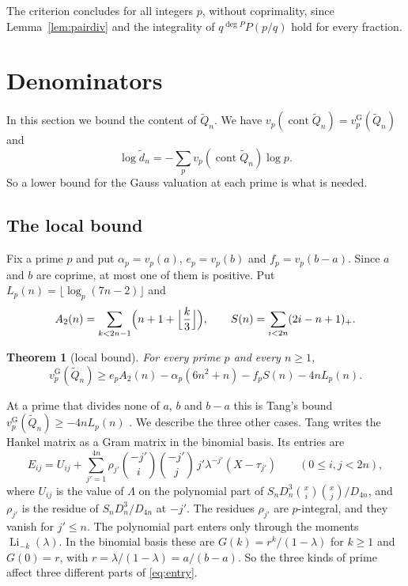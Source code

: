\documentclass[11pt]{amsart}
\newtheorem{theorem}{Theorem}[section]
\theoremstyle{definition}
\theoremstyle{remark}
\numberwithin{equation}{section}
\newcommand{\Li}{\operatorname{Li}}
\newcommand{\vG}{v_p^{\mathrm G}}
\newcommand{\cont}{\operatorname{cont}}
\begin{document}
The criterion concludes for all integers $p$, without coprimality, since Lemma~\ref{lem:pairdiv} and the integrality
of $q^{\deg P}P(p/q)$ hold for every fraction.

\section{Denominators}\label{sec:content}

In this section we bound the content of $\tilde Q_n$. We have $v_p(\cont\tilde Q_n)=\vG(\tilde Q_n)$ and
\[
 \log\tilde d_n=-\sum_pv_p(\cont\tilde Q_n)\log p .
\]
So a lower bound for the Gauss valuation at each prime is what is needed.

\subsection{The local bound}
Fix a prime $p$ and put $\alpha_p=v_p(a)$, $e_p=v_p(b)$ and $f_p=v_p(b-a)$. Since $a$ and $b$ are coprime, at most one
of them is positive. Put $L_p(n)=\lfloor\log_p(7n-2)\rfloor$ and
\[
 A_2(n)=\sum_{k<2n-1}\Bigl(n+1+\Bigl\lfloor\frac k3\Bigr\rfloor\Bigr),\qquad S(n)=\sum_{i<2n}(2i-n+1)_+ .
\]

\begin{theorem}[local bound]\label{thm:K}
For every prime $p$ and every $n\ge1$,
\[
 \vG(\tilde Q_n)\ge e_pA_2(n)-\alpha_p(6n^2+n)-f_pS(n)-4nL_p(n).
\]
\end{theorem}

At a prime that divides none of $a$, $b$ and $b-a$ this is Tang's bound
$\vG(\tilde Q_n)\ge-4nL_p(n)$ \cite{TangLi2}. We describe the three other cases. Tang writes the Hankel matrix as a Gram
matrix in the binomial basis. Its entries are
\begin{equation}\label{eq:entry}
 E_{ij}=U_{ij}+\sum_{j'=1}^{4n}\rho_{j'}\binom{-j'}i\binom{-j'}j\,j'\lambda^{-j'}(X-\tau_{j'})\qquad(0\le i,j<2n),
\end{equation}
where $U_{ij}$ is the value of $\Lambda$ on the polynomial part of $S_nD_n^3\binom xi\binom xj/D_{4n}$, and $\rho_{j'}$
is the residue of $S_nD_n^3/D_{4n}$ at $-j'$. The residues $\rho_{j'}$ are $p$-integral, and they vanish for
$j'\le n$. The polynomial part enters only through the moments $\Li_{-k}(\lambda)$. In the binomial basis these are
$G(k)=r^k/(1-\lambda)$ for $k\ge1$ and $G(0)=r$, with $r=\lambda/(1-\lambda)=a/(b-a)$. So the three kinds of prime affect
three different parts of \eqref{eq:entry}.
\end{document}
